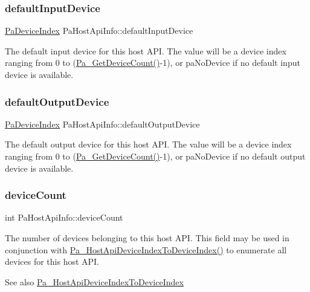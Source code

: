 \subsubsection{\texorpdfstring{default\+Input\+Device}{defaultInputDevice}}
{\footnotesize\ttfamily \hyperlink{portaudio_8h_ad79317e65bde63d76c4b8e711ac5a361}{Pa\+Device\+Index} Pa\+Host\+Api\+Info\+::default\+Input\+Device}

The default input device for this host A\+PI. The value will be a device index ranging from 0 to (\hyperlink{portaudio_8h_acfe4d3c5ec1a343f459981bfa2057f8d}{Pa\+\_\+\+Get\+Device\+Count()}-\/1), or pa\+No\+Device if no default input device is available. \mbox{\label{struct_pa_host_api_info_a62632690b5f7906d3c9bfdab91e7f4b2}} 
\subsubsection{\texorpdfstring{default\+Output\+Device}{defaultOutputDevice}}
{\footnotesize\ttfamily \hyperlink{portaudio_8h_ad79317e65bde63d76c4b8e711ac5a361}{Pa\+Device\+Index} Pa\+Host\+Api\+Info\+::default\+Output\+Device}

The default output device for this host A\+PI. The value will be a device index ranging from 0 to (\hyperlink{portaudio_8h_acfe4d3c5ec1a343f459981bfa2057f8d}{Pa\+\_\+\+Get\+Device\+Count()}-\/1), or pa\+No\+Device if no default output device is available. \mbox{\label{struct_pa_host_api_info_a44e3adfaba0117a6780e2493468c96b1}} 
\subsubsection{\texorpdfstring{device\+Count}{deviceCount}}
{\footnotesize\ttfamily int Pa\+Host\+Api\+Info\+::device\+Count}

The number of devices belonging to this host A\+PI. This field may be used in conjunction with \hyperlink{portaudio_8h_a54f306b5e5258323c95a27c5722258cd}{Pa\+\_\+\+Host\+Api\+Device\+Index\+To\+Device\+Index()} to enumerate all devices for this host A\+PI. \begin{DoxySeeAlso}{See also}
\hyperlink{portaudio_8h_a54f306b5e5258323c95a27c5722258cd}{Pa\+\_\+\+Host\+Api\+Device\+Index\+To\+Device\+Index} 
\end{DoxySeeAlso}
\mbox{\label{struct_pa_host_api_info_a78afe5d557543c82cd9773229e25a8ec}} 

